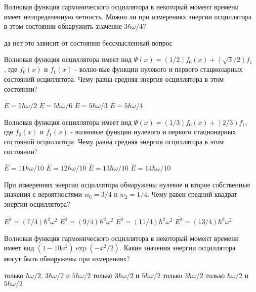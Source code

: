 \documentclass[11pt,a4paper]{exam}
\begin{document}
\begin{questions}
\question Волновая функция гармонического осциллятора в некоторый момент времени имеет неопределенную четность. Можно ли при измерениях энергии осциллятора в этом состоянии обнаружить значение $3\hbar \omega /4$?
\begin{choices}
\choice да    
\choice нет      
\choice это зависит от состояния      
\choice бессмысленный вопрос
\end{choices}

\question Волновая функция осциллятора имеет вид $\Psi (x)=(1/2){{f}_{0}}(x)+(\sqrt{3}/2){{f}_{1}}$, где ${{f}_{0}}(x)$ и ${{f}_{1}}(x)$ - волно-вые функции нулевого и первого стационарных состояний осциллятора. Чему равна средняя энергия осциллятора в этом состоянии?
\begin{choices}
\choice $\overline{E}=5\hbar \omega /2$  
\choice $\overline{E}=5\hbar \omega /6$     
\choice $\overline{E}=5\hbar \omega /3$  
\choice $\overline{E}=5\hbar \omega /4$
\end{choices}

\question Волновая функция осциллятора имеет вид $\Psi (x)=(1/3){{f}_{0}}(x)+(2/3){{f}_{1}}$, где ${{f}_{0}}(x)$ и ${{f}_{1}}(x)$ - волновые функции нулевого и первого стационарных состояний осциллятора. Чему равна средняя энергия осциллятора в этом состоянии?
\begin{choices}
\choice $\overline{E}=11\hbar \omega /10$   
\choice $\overline{E}=12\hbar \omega /10$   
\choice $\overline{E}=13\hbar \omega /10$   
\choice $\overline{E}=14\hbar \omega /10$
\end{choices}

\question При измерениях энергии осциллятора обнаружены нулевое и второе собственные значения с вероятностями ${{w}_{0}}=3/4$ и ${{w}_{2}}=1/4$. Чему равен средний квадрат энергии осциллятора?
\begin{choices}
\choice $\overline{{{E}^{2}}}=(7/4){{\hbar }^{2}}{{\omega }^{2}}$      
\choice $\overline{{{E}^{2}}}=(9/4){{\hbar }^{2}}{{\omega }^{2}}$
\choice $\overline{{{E}^{2}}}=(11/4){{\hbar }^{2}}{{\omega }^{2}}$     
\choice $\overline{{{E}^{2}}}=(13/4){{\hbar }^{2}}{{\omega }^{2}}$
\end{choices}

\question Волновая функция гармонического осциллятора в некоторый момент времени имеет вид $(1-10{{x}^{2}})\exp (-{{x}^{2}}/2)$. Какие значения энергии осциллятора могут быть обнаружены при измерениях?
\begin{choices}
\choice только $\hbar \omega /2$, $3\hbar \omega /2$ и $5\hbar \omega /2$       
\choice только $3\hbar \omega /2$ и $5\hbar \omega /2$
\choice только $3\hbar \omega /2$              
\choice  только $\hbar \omega /2$ и $5\hbar \omega /2$
\end{choices}


\end{questions}
\end{document}
